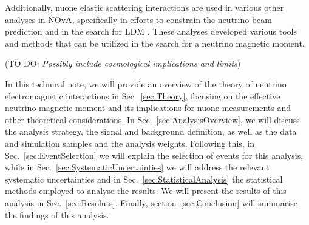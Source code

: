 \documentclass[12pt]{article}
\newcommand{\todo }[1]{({\color{red}\sc TO DO: \textit{#1}})}
\begin{document}
Additionally, \gls{nuone} elastic scattering interactions are used in various other analyses in \gls{NOvA}, specifically in efforts to constrain the neutrino beam prediction \cite{NOVA-doc-56383} and in the search for \gls{LDM} \cite{NOVA-doc-59439}. These analyses developed various tools and methods that can be utilized in the search for a neutrino magnetic moment.

\todo{Possibly include cosmological implications and limits}

In this technical note, we will provide an overview of the theory of neutrino electromagnetic interactions in Sec.~\ref{sec:Theory}, focusing on the effective neutrino magnetic moment and its implications for \gls{nuone} measurements and other theoretical considerations. In Sec.~\ref{sec:AnalysisOverview}, we will discuss the analysis strategy, the signal and background definition, as well as the data and simulation samples and the analysis weights. Following this, in Sec.~\ref{sec:EventSelection} we will explain the selection of events for this analysis, while in Sec.~\ref{sec:SystematicUncertainties} we will address the relevant systematic uncertainties and in Sec.~\ref{sec:StatisticalAnalysis} the statistical methods employed to analyse the results. We will present the results of this analysis in Sec.~\ref{sec:Resoluts}. Finally, section~\ref{sec:Conclusion} will summarise the findings of this analysis.
\end{document}
